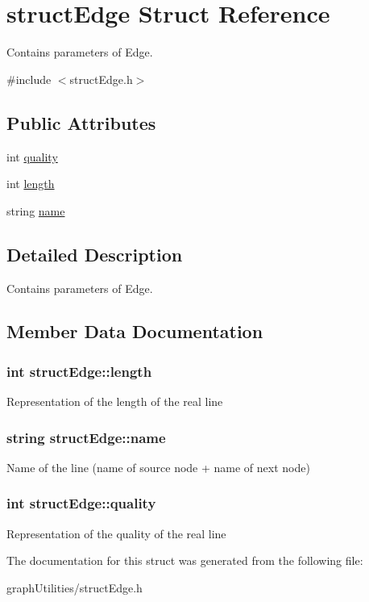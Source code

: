 \hypertarget{structstructEdge}{\section{struct\-Edge Struct Reference}
\label{structstructEdge}
}


Contains parameters of Edge.  




{\ttfamily \#include $<$struct\-Edge.\-h$>$}

\subsection*{Public Attributes}
\begin{DoxyCompactItemize}
\item 
int \hyperlink{structstructEdge_aab7ee24834361ad80f95975372919e66}{quality}
\item 
int \hyperlink{structstructEdge_a40917f9068fc07ec49ea902a54e5966b}{length}
\item 
string \hyperlink{structstructEdge_a0e7d07a3290dfa9881749da1440a588e}{name}
\end{DoxyCompactItemize}


\subsection{Detailed Description}
Contains parameters of Edge. 

\subsection{Member Data Documentation}
\hypertarget{structstructEdge_a40917f9068fc07ec49ea902a54e5966b}{
\subsubsection[{length}]{\setlength{\rightskip}{0pt plus 5cm}int struct\-Edge\-::length}}\label{structstructEdge_a40917f9068fc07ec49ea902a54e5966b}
Representation of the length of the real line \hypertarget{structstructEdge_a0e7d07a3290dfa9881749da1440a588e}{
\subsubsection[{name}]{\setlength{\rightskip}{0pt plus 5cm}string struct\-Edge\-::name}}\label{structstructEdge_a0e7d07a3290dfa9881749da1440a588e}
Name of the line (name of source node + name of next node) \hypertarget{structstructEdge_aab7ee24834361ad80f95975372919e66}{
\subsubsection[{quality}]{\setlength{\rightskip}{0pt plus 5cm}int struct\-Edge\-::quality}}\label{structstructEdge_aab7ee24834361ad80f95975372919e66}
Representation of the quality of the real line 

The documentation for this struct was generated from the following file\-:\begin{DoxyCompactItemize}
\item 
graph\-Utilities/struct\-Edge.\-h\end{DoxyCompactItemize}
